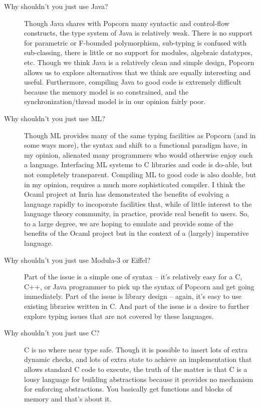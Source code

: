 \documentclass[titlepage,10pt]{article}
\begin{document}
\begin{description}

\item [Why shouldn't you just use Java?] Though Java shares with Popcorn
many syntactic and control-flow constructs, the type system of Java is
relatively weak.   There is no support for parametric or F-bounded
polymorphism, sub-typing is confused with sub-classing, there is little
or no support for modules, algebraic datatypes, etc.  Though we think
Java is a relatively clean and simple design, Popcorn allows us to
explore alternatives that we think are equally interesting and useful.
Furthermore, compiling Java to good code is extremely difficult because
the memory model is so constrained, and the synchronization/thread model
is in our opinion fairly poor.

\item [Why shouldn't you just use ML?] Though ML provides many of the
same typing facilities as Popcorn (and in some ways more), the syntax
and shift to a functional paradigm have, in my opinion, alienated many
programmers who would otherwise enjoy such a language.  Interfacing ML
systems to C libraries and code is do-able, but not completely
transparent.  Compiling ML to good code is also doable, but in my
opinion, requires a much more sophisticated compiler.  I think the Ocaml
project at Inria has demonstrated the benefits of evolving a language
rapidly to incoporate facilities that, while of little interest to the
language theory community, in practice, provide real benefit to users.
So, to a large degree, we are hoping to emulate and provide some of the
benefits of the Ocaml project but in the context of a (largely)
imperative language.

\item [Why shouldn't you just use Modula-3 or Eiffel?] Part of the issue
is a simple one of syntax -- it's relatively easy for a C, C++, or Java
programmer to pick up the syntax of Popcorn and get going immediately.
Part of the issue is library design -- again, it's easy to use existing
libraries written in C.  And part of the issue is a desire to further
explore typing issues that are not covered by these languages.

\item [Why shouldn't you just use C?] C is no where near type safe.
Though it is possible to insert lots of extra dynamic checks, and lots
of extra state to achieve an implementation that allows standard C code
to execute, the truth of the matter is that C is a lousy language for
building abstractions because it provides no mechanism for enforcing
abstractions.  You basically get functions and blocks of memory and
that's about it.

\end{description}
\end{document}
